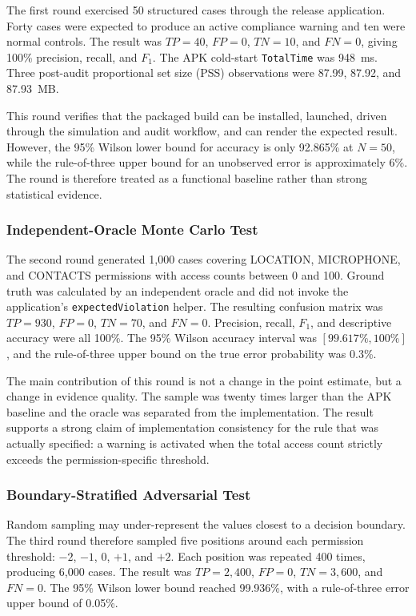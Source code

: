 The first round exercised 50 structured cases through the release application. Forty cases were expected to produce an active compliance warning and ten were normal controls. The result was $TP=40$, $FP=0$, $TN=10$, and $FN=0$, giving 100\% precision, recall, and $F_1$. The APK cold-start \texttt{TotalTime} was 948~ms. Three post-audit proportional set size (PSS) observations were 87.99, 87.92, and 87.93~MB.

This round verifies that the packaged build can be installed, launched, driven through the simulation and audit workflow, and can render the expected result. However, the 95\% Wilson lower bound for accuracy is only 92.865\% at $N=50$, while the rule-of-three upper bound for an unobserved error is approximately 6\%. The round is therefore treated as a functional baseline rather than strong statistical evidence.

\subsubsection{Independent-Oracle Monte Carlo Test}

The second round generated 1,000 cases covering LOCATION, MICROPHONE, and CONTACTS permissions with access counts between 0 and 100. Ground truth was calculated by an independent oracle and did not invoke the application's \texttt{expectedViolation} helper. The resulting confusion matrix was $TP=930$, $FP=0$, $TN=70$, and $FN=0$. Precision, recall, $F_1$, and descriptive accuracy were all 100\%. The 95\% Wilson accuracy interval was $[99.617\%,100\%]$, and the rule-of-three upper bound on the true error probability was 0.3\%.

The main contribution of this round is not a change in the point estimate, but a change in evidence quality. The sample was twenty times larger than the APK baseline and the oracle was separated from the implementation. The result supports a strong claim of implementation consistency for the rule that was actually specified: a warning is activated when the total access count strictly exceeds the permission-specific threshold.

\subsubsection{Boundary-Stratified Adversarial Test}

Random sampling may under-represent the values closest to a decision boundary. The third round therefore sampled five positions around each permission threshold: $-2$, $-1$, $0$, $+1$, and $+2$. Each position was repeated 400 times, producing 6,000 cases. The result was $TP=2,400$, $FP=0$, $TN=3,600$, and $FN=0$. The 95\% Wilson lower bound reached 99.936\%, with a rule-of-three error upper bound of 0.05\%.

